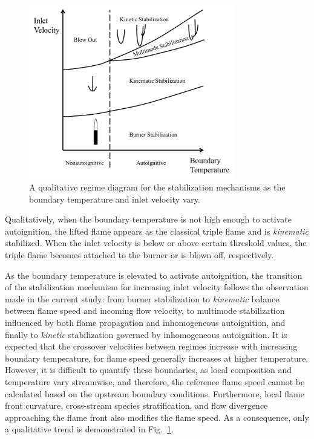 \documentclass{wssci}
\begin{document}
\begin{figure}
  \centering
  \scriptsize
  \vspace{-0.1in}
  \includegraphics[width=0.8\textwidth]{2D-regime.png}
  \normalsize
  \vspace{-0.1in}
  \caption{A qualitative regime diagram for the stabilization mechanisms as the boundary temperature and inlet velocity vary. }
  \label{fig:2D-regime}
\end{figure}

Qualitatively, when the boundary temperature is not high enough to activate autoignition, the lifted flame appears as the classical triple flame and is \emph{kinematic} stabilized.  When the inlet velocity is below or above certain threshold values, the triple flame becomes attached to the burner or is blown off, respectively.  

As the boundary temperature is elevated to activate autoignition, the transition of the stabilization mechanism for increasing inlet velocity follows the observation made in the current study: from burner stabilization to \emph{kinematic} balance between flame speed and incoming flow velocity, to multimode stabilization influenced by both flame propagation and inhomogeneous autoignition, and finally to \emph {kinetic} stabilization governed by inhomogeneous autoignition.  It is expected that the crossover velocities between regimes increase with increasing boundary temperature, for flame speed generally increases at higher temperature.  However, it is difficult to quantify these boundaries, as local composition and temperature vary streamwise, and therefore, the reference flame speed cannot be calculated based on the upstream boundary conditions.  Furthermore, local flame front curvature, cross-stream species stratification, and flow divergence approaching the flame front also modifies the flame speed.  As a consequence, only a qualitative trend is demonstrated in Fig.~\ref{fig:2D-regime}.  
\end{document}
